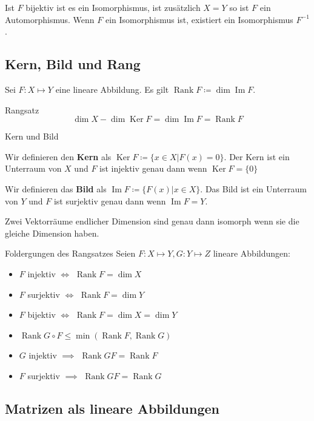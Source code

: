\documentclass[a4paper,10pt]{article}
\DeclareMathOperator{\Rank}{Rank}
\DeclareMathOperator{\Image}{Im}
\DeclareMathOperator{\Kernel}{Ker}
\begin{document}
Ist $F$ bijektiv ist es ein Isomorphismus, ist zusätzlich $X = Y$ so ist $F$ ein Automorphismus. Wenn $F$ ein Isomorphismus ist, existiert ein Isomorphismus $F^{-1}$.

\subsection{Kern, Bild und Rang}


Sei $F: X \mapsto Y$ eine lineare Abbildung. Es gilt $\Rank F \coloneqq \dim \Image F$.

\begin{mainbox}{Rangsatz}
  $$\dim X - \dim \Kernel F = \dim \Image F = \Rank F$$
\end{mainbox}

\begin{mainbox}{Kern und Bild}

  Wir definieren den \textbf{Kern} als $\Kernel F \coloneqq \{x \in X | F(x) = 0\}$. Der Kern ist ein Unterraum von $X$ und $F$ ist injektiv genau dann wenn $\Kernel F = \{0\}$

  Wir definieren das \textbf{Bild} als $\Image F \coloneqq \{F(x) | x \in X\}$. Das Bild ist ein Unterraum von $Y$ und $F$ ist surjektiv genau dann wenn $\Image F = Y$.
\end{mainbox}

Zwei Vektorräume endlicher Dimension sind genau dann isomorph wenn sie die gleiche Dimension haben.

\begin{subbox}{Foldergungen des Rangsatzes}
  Seien $F: X \mapsto Y, G: Y \mapsto Z$ lineare Abbildungen:
  \begin{itemize}
    \item $F$ injektiv $\iff$ $\Rank F = \dim X$
    \item $F$ surjektiv $\iff$ $\Rank F = \dim Y$
    \item $F$ bijektiv $\iff$ $\Rank F = \dim X = \dim Y$
    \item $\Rank G \circ F \leq \min(\Rank F, \Rank G)$
    \item $G$ injektiv $\implies$ $\Rank GF = \Rank F$
    \item $F$ surjektiv $\implies$ $\Rank GF = \Rank G$
  \end{itemize}
\end{subbox}

\subsection{Matrizen als lineare Abbildungen}
\end{document}
